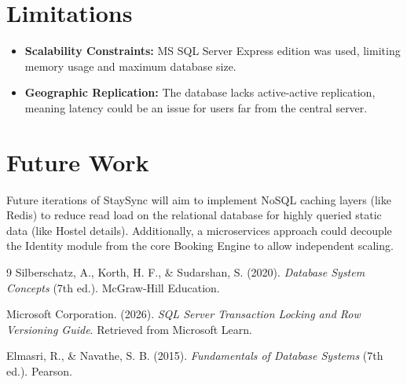 \documentclass[12pt, a4paper]{report}
\begin{document}
\section{Limitations}
\begin{itemize}
    \item \textbf{Scalability Constraints:} MS SQL Server Express edition was used, limiting memory usage and maximum database size.
    \item \textbf{Geographic Replication:} The database lacks active-active replication, meaning latency could be an issue for users far from the central server.
\end{itemize}

\section{Future Work}
Future iterations of StaySync will aim to implement NoSQL caching layers (like Redis) to reduce read load on the relational database for highly queried static data (like Hostel details). Additionally, a microservices approach could decouple the Identity module from the core Booking Engine to allow independent scaling.

\renewcommand\bibname{References}
\begin{thebibliography}{9}
Silberschatz, A., Korth, H. F., \& Sudarshan, S. (2020). \textit{Database System Concepts} (7th ed.). McGraw-Hill Education.

Microsoft Corporation. (2026). \textit{SQL Server Transaction Locking and Row Versioning Guide}. Retrieved from Microsoft Learn.

Elmasri, R., \& Navathe, S. B. (2015). \textit{Fundamentals of Database Systems} (7th ed.). Pearson.

\end{thebibliography}
\end{document}

